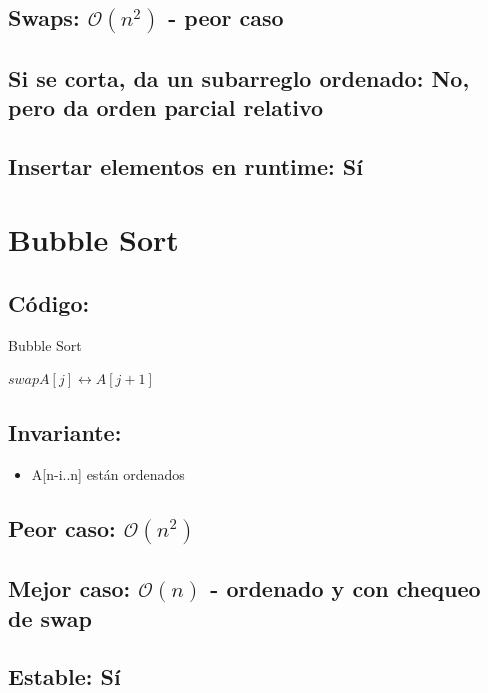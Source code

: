 \documentclass[a4paper]{article}
\begin{document}
\subsection{Swaps: $\mathcal{O}(n^{2})$ - peor caso}
\subsection{Si se corta, da un subarreglo ordenado: No, pero da orden parcial relativo}
\subsection{Insertar elementos en runtime: S\'i}

\newpage
\section{Bubble Sort}

\subsection{C\'odigo:}
\begin{algorithm}
\caption{Bubble Sort}\label{selection}
\begin{algorithmic}[1]
			\State $swap A[j] \leftrightarrow A[j+1]$
		\EndIf
	\EndFor
    \EndFor
\EndProcedure
\end{algorithmic}
\end{algorithm}

\subsection{Invariante:}
\begin{itemize}
	\item{A[n-i..n] est\'an ordenados}
\end{itemize}

\subsection{Peor caso: $\mathcal{O}(n^{2})$}
\subsection{Mejor caso: $\mathcal{O}(n)$ - ordenado y con chequeo de swap}
\subsection{Estable: S\'i}
\end{document}
